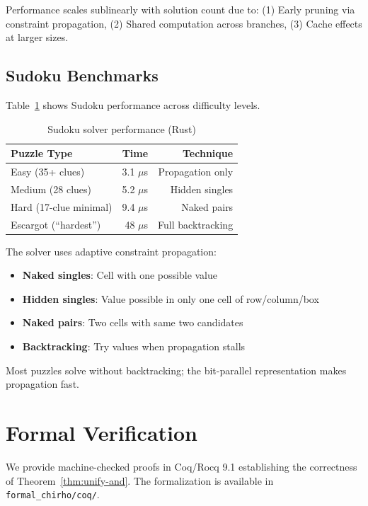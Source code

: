 \documentclass[11pt,a4paper]{article}
\begin{document}
Performance scales sublinearly with solution count due to:
(1) Early pruning via constraint propagation,
(2) Shared computation across branches,
(3) Cache effects at larger sizes.

\subsection{Sudoku Benchmarks}

Table~\ref{tab:sudoku} shows Sudoku performance across difficulty levels.

\begin{table}[ht]
\centering
\begin{tabular}{lrr}
\toprule
\textbf{Puzzle Type} & \textbf{Time} & \textbf{Technique} \\
\midrule
Easy (35+ clues) & 3.1 $\mu$s & Propagation only \\
Medium (28 clues) & 5.2 $\mu$s & Hidden singles \\
Hard (17-clue minimal) & 9.4 $\mu$s & Naked pairs \\
Escargot (``hardest'') & 48 $\mu$s & Full backtracking \\
\bottomrule
\end{tabular}
\caption{Sudoku solver performance (Rust)}
\label{tab:sudoku}
\end{table}

The solver uses adaptive constraint propagation:
\begin{itemize}
  \item \textbf{Naked singles}: Cell with one possible value
  \item \textbf{Hidden singles}: Value possible in only one cell of row/column/box
  \item \textbf{Naked pairs}: Two cells with same two candidates
  \item \textbf{Backtracking}: Try values when propagation stalls
\end{itemize}

Most puzzles solve without backtracking; the bit-parallel representation makes propagation fast.

\section{Formal Verification}

We provide machine-checked proofs in Coq/Rocq 9.1 establishing the correctness of Theorem~\ref{thm:unify-and}.
The formalization is available in \texttt{formal\_chirho/coq/}.
\end{document}

